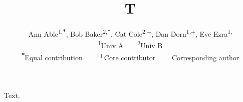 \documentclass{article}
\title{T}
\author{Ann Able\textsuperscript{1,\textbf{*}}, Bob Baker\textsuperscript{2,\textbf{*}}, Cat Cole\textsuperscript{2,+},
Dan Dorn\textsuperscript{1,+}, Eve Ezra\textsuperscript{1,\textbf{\textdagger}} \\
\textsuperscript{1}Univ A~~~~\textsuperscript{2}Univ B \\
\small \textsuperscript{\textbf{*}}Equal contribution~~~~ \small \textsuperscript{\textbf{+}}Core contributor~~~~
\small \textsuperscript{\textbf{\textdagger}}Corresponding author}
\date{}
\begin{document}
\maketitle
Text.
\end{document}

